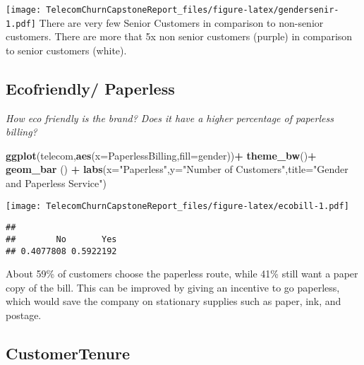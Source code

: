 \documentclass[]{article}
\newenvironment{Shaded}{\begin{snugshade}}{\end{snugshade}}
\newcommand{\KeywordTok}[1]{\textcolor[rgb]{0.13,0.29,0.53}{\textbf{#1}}}
\newcommand{\DataTypeTok}[1]{\textcolor[rgb]{0.13,0.29,0.53}{#1}}
\newcommand{\StringTok}[1]{\textcolor[rgb]{0.31,0.60,0.02}{#1}}
\newcommand{\OperatorTok}[1]{\textcolor[rgb]{0.81,0.36,0.00}{\textbf{#1}}}
\newcommand{\NormalTok}[1]{#1}
\begin{document}
\texttt{[image: TelecomChurnCapstoneReport\_files/figure-latex/gendersenir-1.pdf]}
There are very few Senior Customers in comparison to non-senior
customers. There are more that 5x non senior customers (purple) in
comparison to senior customers (white).

\subsection{Ecofriendly/ Paperless}\label{ecofriendly-paperless}

\emph{How eco friendly is the brand? Does it have a higher percentage of
paperless billing?}

\begin{Shaded}
\begin{Highlighting}[]
\KeywordTok{ggplot}\NormalTok{(telecom,}\KeywordTok{aes}\NormalTok{(}\DataTypeTok{x=}\NormalTok{PaperlessBilling,}\DataTypeTok{fill=}\NormalTok{gender))}\OperatorTok{+}
\StringTok{  }\KeywordTok{theme_bw}\NormalTok{()}\OperatorTok{+}
\StringTok{  }\KeywordTok{geom_bar}\NormalTok{ () }\OperatorTok{+}
\StringTok{  }\KeywordTok{labs}\NormalTok{(}\DataTypeTok{x=}\StringTok{"Paperless"}\NormalTok{,}\DataTypeTok{y=}\StringTok{"Number of Customers"}\NormalTok{,}\DataTypeTok{title=}\StringTok{"Gender and Paperless Service"}\NormalTok{)}
\end{Highlighting}
\end{Shaded}

\texttt{[image: TelecomChurnCapstoneReport\_files/figure-latex/ecobill-1.pdf]}

\begin{Shaded}
\end{Shaded}

\begin{verbatim}
## 
##        No       Yes 
## 0.4077808 0.5922192
\end{verbatim}

About 59\% of customers choose the paperless route, while 41\% still
want a paper copy of the bill. This can be improved by giving an
incentive to go paperless, which would save the company on stationary
supplies such as paper, ink, and postage.

\subsection{CustomerTenure}\label{customertenure}
\end{document}
